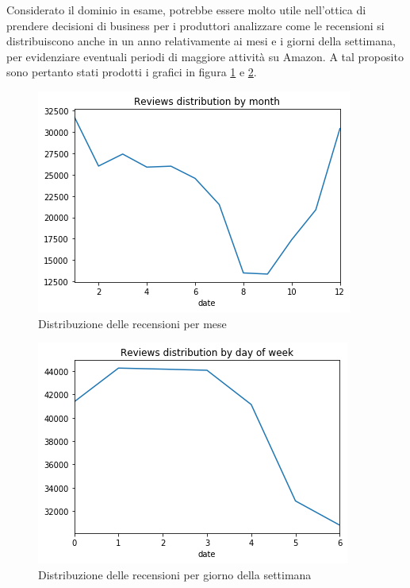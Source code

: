\documentclass[hidelinks, 12pt]{article}
\begin{document}
\clearpage

Considerato il dominio in esame, potrebbe essere molto utile nell'ottica di prendere decisioni di business per i produttori analizzare come le recensioni si distribuiscono anche in un anno relativamente ai mesi e i giorni della settimana, per evidenziare eventuali periodi di maggiore attività su Amazon. A tal proposito sono pertanto stati prodotti i grafici in figura \ref{fig:month-distr} e \ref{fig:day-distr}.

\begin{figure}[H]
	\centering
	\includegraphics[scale=0.7]{images/02_03_month_distr.png}
	\caption[Distribuzione delle recensioni per mese]{Distribuzione delle recensioni per mese}
	\label{fig:month-distr}
\end{figure}

\begin{figure}[H]
	\centering
	\includegraphics[scale=0.7]{images/02_04_day_distr.png}
	\caption[Distribuzione delle recensioni per giorno della settimana]{Distribuzione delle recensioni per giorno della settimana}
	\label{fig:day-distr}
\end{figure}
\end{document}
